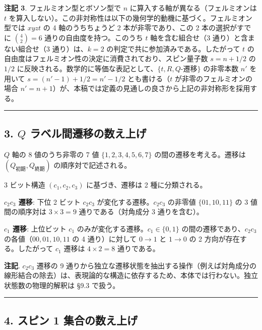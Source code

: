 \documentclass[
  a4paper,11pt]{ltjsarticle}
\theoremstyle{definition}
\theoremstyle{remark}
\begin{document}
\textbf{注記 3}. フェルミオン型とボソン型で \(n\)
に算入する軸が異なる（フェルミオンは \(t\)
を算入しない）。この非対称性は以下の幾何学的動機に基づく。フェルミオン型では
\(xyzt\) の 4 軸のうちちょうど 2 本が非零であり、この 2 本の選択がすでに
\(\binom{4}{2} = 6\) 通りの自由度を持つ。このうち \(t\)
軸を含む組合せ（3 通り）と含まない組合せ（3 通り）は、\(k = 2\)
の判定で共に参加済みである。したがって \(t\)
の自由度はフェルミオン性の決定に消費されており、スピン量子数
\(s = n + 1/2\) の \(1/2\)
に反映される。数学的に等価な表記として、\(\{t, R, Q\text{-遷移}\}\)
の非零本数 \(n'\) を用いて \(s = (n' - 1) + 1/2 = n' - 1/2\)
とも書ける（\(t\) が非零のフェルミオンの場合
\(n' = n + 1\)）が、本稿では定義の見通しの良さから上記の非対称形を採用する。

\begin{center}\rule{0.5\linewidth}{0.5pt}\end{center}

\subsection{\texorpdfstring{3. \(Q\)
ラベル間遷移の数え上げ}{3. Q ラベル間遷移の数え上げ}}\label{q-ux30e9ux30d9ux30ebux9593ux9077ux79fbux306eux6570ux3048ux4e0aux3052}

\(Q\) 軸の 8 値のうち非零の 7 値 \(\{1, 2, 3, 4, 5, 6, 7\}\)
の間の遷移を考える。遷移は \((Q_\text{初期}, Q_\text{終期})\)
の順序対で記述される。

3 ビット構造 \((c_1, c_2, c_3)\) に基づき、遷移は 2 種に分類される。

\textbf{\(c_2 c_3\) 遷移}: 下位 2 ビット \(c_2 c_3\)
が変化する遷移。\(c_2 c_3\) の非零値 \(\{01, 10, 11\}\) の 3
値間の順序対は \(3 \times 3 = 9\) 通りである（対角成分 3 通りを含む）。

\textbf{\(c_1\) 遷移}: 上位ビット \(c_1\)
のみが変化する遷移。\(c_1 \in \{0, 1\}\) の間の遷移であり、\(c_2 c_3\)
の各値（\(00, 01, 10, 11\) の 4 通り）に対して \(0 \to 1\) と
\(1 \to 0\) の 2 方向が存在する。したがって \(c_1\) 遷移は
\(4 \times 2 = 8\) 通りである。

\textbf{注記}. \(c_2 c_3\) 遷移の 9
通りから独立な遷移状態を抽出する操作（例えば対角成分の線形結合の除去）は、表現論的な構造に依存するため、本体では行わない。独立状態数の物理的解釈は
§9.3 で扱う。

\begin{center}\rule{0.5\linewidth}{0.5pt}\end{center}

\subsection{4. スピン 1
集合の数え上げ}\label{ux30b9ux30d4ux30f3-1-ux96c6ux5408ux306eux6570ux3048ux4e0aux3052}
\end{document}
